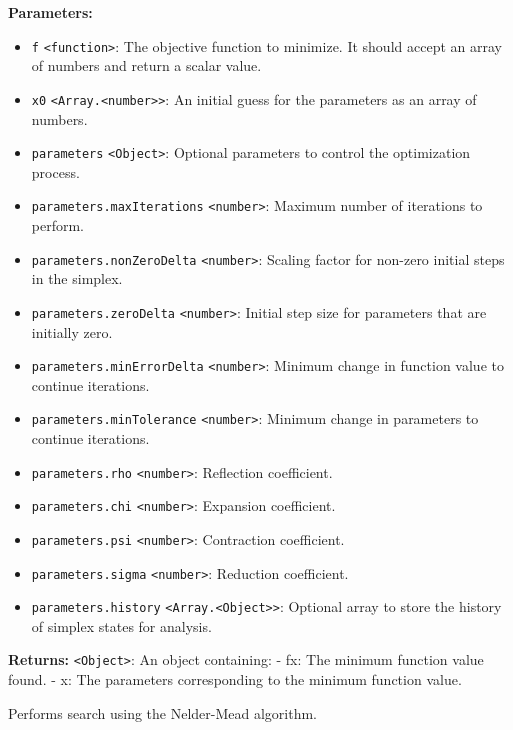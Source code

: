 \documentclass[12pt,a4paper]{article}
\begin{document}
\noindent \textbf{Parameters:}
\begin{itemize}
  \item \texttt{f} \texttt{<function>}: The objective function to minimize. It should accept an array of numbers and return a scalar value.
  \item \texttt{x0} \texttt{<Array.<number>>}: An initial guess for the parameters as an array of numbers.
  \item \texttt{parameters} \texttt{<Object>}: Optional parameters to control the optimization process.
  \item \texttt{parameters.maxIterations} \texttt{<number>}: Maximum number of iterations to perform.
  \item \texttt{parameters.nonZeroDelta} \texttt{<number>}: Scaling factor for non-zero initial steps in the simplex.
  \item \texttt{parameters.zeroDelta} \texttt{<number>}: Initial step size for parameters that are initially zero.
  \item \texttt{parameters.minErrorDelta} \texttt{<number>}: Minimum change in function value to continue iterations.
  \item \texttt{parameters.minTolerance} \texttt{<number>}: Minimum change in parameters to continue iterations.
  \item \texttt{parameters.rho} \texttt{<number>}: Reflection coefficient.
  \item \texttt{parameters.chi} \texttt{<number>}: Expansion coefficient.
  \item \texttt{parameters.psi} \texttt{<number>}: Contraction coefficient.
  \item \texttt{parameters.sigma} \texttt{<number>}: Reduction coefficient.
  \item \texttt{parameters.history} \texttt{<Array.<Object>>}: Optional array to store the history of simplex states for analysis.
\end{itemize}

\noindent \textbf{Returns:} \texttt{<Object>}: An object containing:
  - \textasciigrave{}fx\textasciigrave{}: The minimum function value found.
  - \textasciigrave{}x\textasciigrave{}: The parameters corresponding to the minimum function value.

\noindent Performs search using the Nelder-Mead algorithm.

\vspace{5mm}
\noindent {}
\end{document}
